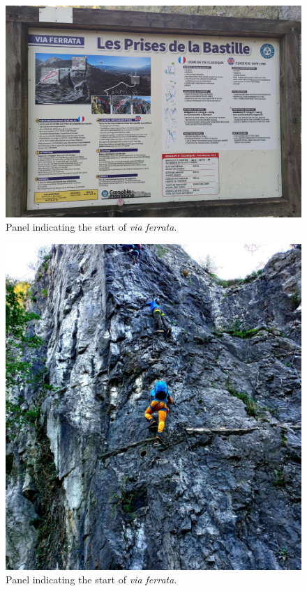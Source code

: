 \begin{figure}[!ht]
	\centering%
	\includegraphics[width=\columnwidth, clip]{media/pictures/via-ferrata-les-prises-de-la-bastille-1}
	\caption{\label{fig:via-ferrata-les-prises-de-la-bastille-1}Panel indicating the start of \emph{via ferrata}.}
\end{figure}

\begin{figure}[!ht]
	\centering%
	\includegraphics[width=\columnwidth, clip]{media/pictures/via-ferrata-les-prises-de-la-bastille-2}
	\caption{\label{fig:via-ferrata-les-prises-de-la-bastille-2}Panel indicating the start of \emph{via ferrata}.}
\end{figure}

